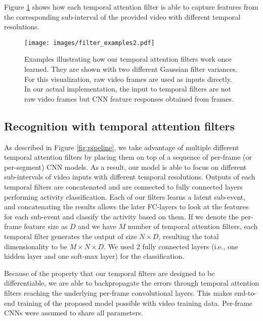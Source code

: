 \documentclass[letterpaper]{article}
\begin{document}
Figure \ref{fig:filter_example} shows how each temporal attention filter is able to capture features from the corresponding sub-interval of the provided video with different temporal resolutions.


\begin{figure}[!tbp]
\begin{center}
   \texttt{[image: images/filter\_examples2.pdf]}
\end{center}
   \caption{Examples illustrating how our temporal attention filters work once learned. They are shown with two different Gaussian filter variances. For this visualization, raw video frames are used as inputs directly. In our actual implementation, the input to temporal filters are not raw video frames but CNN feature responses obtained from frames.}
\label{fig:filter_example}		
\end{figure}




\subsection{Recognition with temporal attention filters}
\label{subsec:recognition}

As described in Figure \ref{fig:pipeline}, we take advantage of multiple different temporal attention filters by placing them on top of a sequence of per-frame (or per-segment) CNN models. As a result, our model is able to focus on different sub-intervals of video inputs with different temporal resolutions. Outputs of each temporal filters are concatenated and are connected to fully connected layers performing activity classification. Each of our filters learns a latent sub-event, and concatenating the results allows the later FC-layers to look at the features for each sub-event and classify the activity based on them. If we denote the per-frame feature size as $D$ and we have $M$ number of temporal attention filters, each temporal filter generates the output of size $N\times D$, resulting the total dimensionality to be $M\times N\times D$. We used 2 fully connected layers (i.e., one hidden layer and one soft-max layer) for the classification. 

Because of the property that our temporal filters are designed to be differentiable, we are able to backpropagate the errors through temporal attention filters reaching the underlying per-frame convolutional layers. This makes end-to-end training of the proposed model possible with video training data. Per-frame CNNs were assumed to share all parameters.
\end{document}
